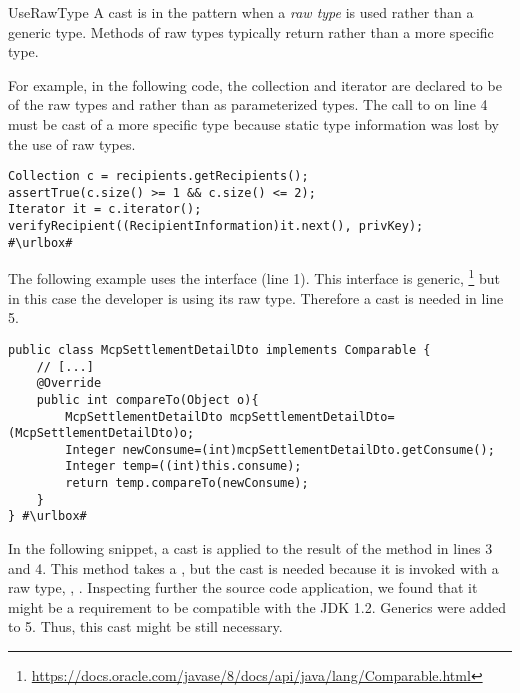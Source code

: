 \begin{pattern}{UseRawType}
A cast is in the \thisp{} pattern when a \emph{raw type} is used rather than a generic type.
Methods of raw types typically return  rather than a more specific type.

\instances{}
For example, in the following code,
the collection  and iterator  are declared to be of the raw types  and  rather than as parameterized types.
The call to  on line 4 must be cast of a more specific type because static type information was lost by the use of raw types.

\def\urlvar{http://bit.ly/bcgit_bc_java_2SD2HLm}
\begin{verbatim}
Collection c = recipients.getRecipients();
assertTrue(c.size() >= 1 && c.size() <= 2);
Iterator it = c.iterator();
verifyRecipient((RecipientInformation)it.next(), privKey);
#\urlbox#
\end{verbatim}

The following example uses the  interface (line 1).
This interface is generic,%
\footnote{\url{https://docs.oracle.com/javase/8/docs/api/java/lang/Comparable.html}}
but in this case the developer is using its raw type.
Therefore a cast is needed in line 5.

\def\urlvar{http://bit.ly/fangjie008_tiexue_mcp_parent_2FSZKzm}
\begin{verbatim}
public class McpSettlementDetailDto implements Comparable {
    // [...]
    @Override
    public int compareTo(Object o){
        McpSettlementDetailDto mcpSettlementDetailDto=(McpSettlementDetailDto)o;
        Integer newConsume=(int)mcpSettlementDetailDto.getConsume();
        Integer temp=((int)this.consume);
        return temp.compareTo(newConsume);
    }
} #\urlbox#
\end{verbatim}


In the following snippet,
a cast is applied to the result of the  method in lines 3 and 4.
This method takes a ,
but the cast is needed because it is invoked with a raw type,
\eg{}, .
Inspecting further the source code application,
we found that it might be a requirement to be compatible with the JDK 1.2.
Generics were added to \java{} 5.
Thus, this cast might be still necessary.


\end{pattern}
